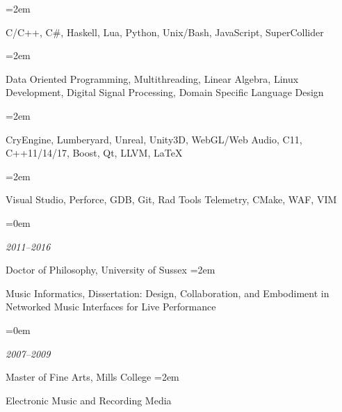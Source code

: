\documentclass{scrartcl}
\newlength{\datebox}\settowidth{\datebox}{2011--Present} %
\newcommand{\NewEntry}[3]{\noindent\hangindent=0em\hangafter=0 \parbox{\datebox}{\small \textit{#1}} #2 #3 %
} %
\newcommand{\Description}[1]{\hangindent=2em\hangafter=0\noindent\raggedright\footnotesize{#1}\par\normalsize\vspace{1em}} %
\begin{document}
\begin{cv}{}
\vspace{0.5em} %


\vspace{1em}

\Description{C/C++, C\#, Haskell, Lua, Python, Unix/Bash, JavaScript, SuperCollider}

\vspace{1em}

\Description{Data Oriented Programming, Multithreading, Linear Algebra, Linux Development, Digital Signal Processing, Domain Specific Language Design}

\vspace{1em}

\Description{CryEngine, Lumberyard, Unreal, Unity3D, WebGL/Web Audio, C11, C++11/14/17, Boost, Qt, LLVM, LaTeX}

\vspace{1em}

\Description{Visual Studio, Perforce, GDB, Git, Rad Tools Telemetry, CMake, WAF, VIM}

\vspace{0.5em} %



\noindent{}\vspace{1em}

\NewEntry{2011--2016}{Doctor of Philosophy, University of Sussex}

\Description{Music Informatics, Dissertation: Design, Collaboration, and Embodiment in Networked Music Interfaces for Live Performance}


\NewEntry{2007--2009}{Master of Fine Arts, Mills College}

\Description{Electronic Music and Recording Media}


\end{cv}
\end{document}
